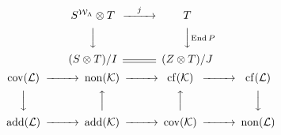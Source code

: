 \documentclass{article}
\newcommand{\End}{\operatorname{End}}
\newcommand{\cov}{\operatorname{cov}}
\newcommand{\non}{\operatorname{non}}
\newcommand{\add}{\operatorname{add}}
\newcommand{\cf}{\operatorname{cf}}
\begin{document}
\begin{equation}
\begin{CD}
S^{{\mathcal{W}}_\Lambda}\otimes T @>j>> T\\
@VVV @VV{\End P}V\\
(S\otimes T)/I @= (Z\otimes T)/J
\end{CD}
\end{equation}
\begin{equation}
\begin{CD}
\cov(\mathcal{L}) @>>> \non(\mathcal{K}) @>>> \cf(\mathcal{K}) @>>> \cf(\mathcal{L})\\
@VVV @AAA @AAA @VVV\\
\add(\mathcal{L}) @>>> \add(\mathcal{K}) @>>> \cov(\mathcal{K}) @>>> \non(\mathcal{L})
\end{CD}
\end{equation}
\end{document}
